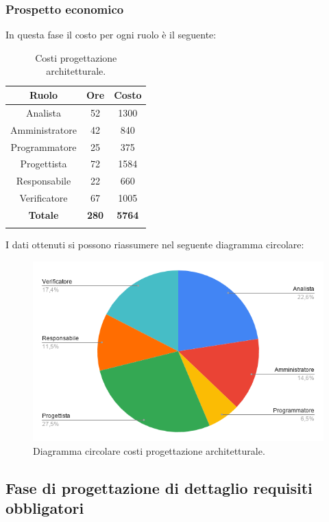 \subsubsection{Prospetto economico}

In questa fase il costo per ogni ruolo è il seguente:
\begin{longtable}{|c|c|c|}
	\hline
	\rowcolor[HTML]{F9CB9C} 
	\textbf{Ruolo} & \textbf{Ore} & \textbf{Costo} \\
	\hline
	Analista &
	52 &
	1300 \\
	\hline
	Amministratore  &
	42 &
	840 \\
	\hline
	Programmatore &
	25 &
	375 \\
	\hline
	Progettista &
	72 &
	1584 \\
	\hline
	Responsabile &
	22 &
	660 \\
	\hline
	Verificatore &
	67 &
	1005 \\
	\hline
	\rowcolor[HTML]{F9CB9C} 
	\textbf{Totale} & \textbf{280} & \textbf{5764} \\
	\hline
	\caption{Costi progettazione architetturale.}
	\label{fig: Costi progettazione architetturale.}
\end{longtable}

I dati ottenuti si possono riassumere nel seguente diagramma circolare:
\begin{figure}[H]
	\centering
	\includegraphics[width=0.6\linewidth]{./res/images/CostiProgettazioneArchitetturale.png}
	\caption{Diagramma circolare costi progettazione architetturale.}
	\label{fig: Diagramma circolare costi progettazione architetturale.}
\end{figure}



			
%
%
%
%
\subsection{Fase di progettazione di dettaglio requisiti obbligatori}

